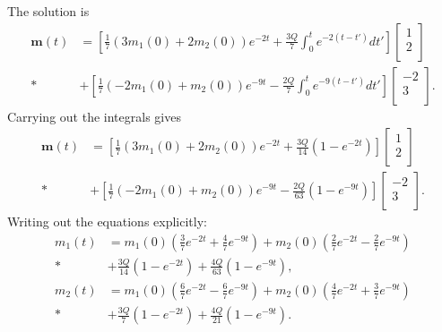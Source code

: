 The solution is
\begin{align}
  \mathbf{m}(t) 
  &= \left[ \frac{1}{7} (  3 m_1(0) + 2 m_2(0) ) e^{-2t} + \frac{3Q}{7} \int_0^t e^{-2(t-t')} dt' \right] \left[ \begin{array}{r}  1 \\ 2 \\ \end{array} \right] \nonumber \\*
  &+ \left[ \frac{1}{7} ( -2 m_1(0) +   m_2(0) ) e^{-9t} - \frac{2Q}{7} \int_0^t e^{-9(t-t')} dt' \right] \left[ \begin{array}{r} -2 \\ 3 \\ \end{array} \right] .
\end{align}
Carrying out the integrals gives
\begin{align}
  \mathbf{m}(t) 
  &= \left[ \frac{1}{7} (  3 m_1(0) + 2 m_2(0) ) e^{-2t} + \frac{3Q}{14} ( 1 -  e^{-2t} ) \right] \left[ \begin{array}{r}  1 \\ 2 \\ \end{array} \right] \nonumber \\*
  &+ \left[ \frac{1}{7} ( -2 m_1(0) +   m_2(0) ) e^{-9t} - \frac{2Q}{63} ( 1 -  e^{-9t} ) \right] \left[ \begin{array}{r} -2 \\ 3 \\ \end{array} \right] .
\end{align}
Writing out the equations explicitly:
\begin{subequations}
\begin{align}
  m_1(t) &= m_1(0) \left( \frac{3}{7} e^{-2t} + \frac{4}{7} e^{-9t} \right) 
          + m_2(0) \left( \frac{2}{7} e^{-2t} - \frac{2}{7} e^{-9t} \right) \nonumber \\*
         &+ \frac{3Q}{14} ( 1 -  e^{-2t} ) + \frac{4Q}{63} ( 1 -  e^{-9t} ) , \\
  m_2(t) &= m_1(0) \left( \frac{6}{7} e^{-2t} - \frac{6}{7} e^{-9t} \right)
          + m_2(0) \left( \frac{4}{7} e^{-2t} + \frac{3}{7} e^{-9t} \right) \nonumber \\*
         &+ \frac{3Q}{7} ( 1 -  e^{-2t} ) + \frac{4Q}{21} ( 1 -  e^{-9t} ) .
\end{align}
\end{subequations}

